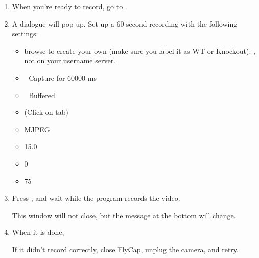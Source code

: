 \documentclass[letterpaper,10pt,english]{jupyterBook}
\begin{document}
\begin{enumerate}
%
\item {} 
\sphinxAtStartPar
When you’re ready to record, go to .

\item {} 
\sphinxAtStartPar
A dialogue will pop up. Set up a 60 second recording with the following settings:
\begin{itemize}
\item {} 
\sphinxAtStartPar
{} browse to create your own (make sure you label it as WT or Knockout). , not on your username server. 

\item {} 
\sphinxAtStartPar
🔘 Capture for 60000 ms

\item {} 
\sphinxAtStartPar
🔘 Buffered

\item {} 
\sphinxAtStartPar
(Click on  tab)

\item {} 
\sphinxAtStartPar
{} M\sphinxhyphen{}JPEG

\item {} 
\sphinxAtStartPar
{} 15.0

\item {} 
\sphinxAtStartPar
{} 0

\item {} 
\sphinxAtStartPar
{} 75

\end{itemize}

\item {} 
\sphinxAtStartPar
Press , and wait while the program records the video.

\sphinxAtStartPar
{} This window will not close, but the message at the bottom will change.

\item {} 
\sphinxAtStartPar
When it is done, 

\sphinxAtStartPar
{} If it didn’t record correctly, close FlyCap, unplug the camera, and retry.


\end{enumerate}
\end{document}
